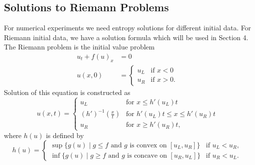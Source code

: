 \subsection{Solutions to Riemann Problems}
For numerical experiments we need entropy solutions for different initial data. For Riemann initial data, we have a solution formula which will be used in Section 4.
The Riemann problem is the initial value problem
\begin{equation}\label{eq: Riemann problem}
    \begin{split}
        u_{t} + f(u)_{x} & = 0 \\
        u(x,0)           & =
        \begin{cases}
            u_{L} & \text{if } x < 0  \\
            u_{R} & \text{if } x > 0.
        \end{cases}
    \end{split}
\end{equation}
Solution of this equation is constructed as
\begin{equation}\label{eq: Riemann solution}
    u(x,t)=
    \begin{cases}
        u_{L}                  & \text{for } x \leq h'(u_L)t               \\
        (h')^{-1}(\frac{x}{t}) & \text{for } h'(u_L)t \leq x \leq h'(u_R)t \\
        u_{R}                  & \text{for } x \geq h'(u_R)t,
    \end{cases}
\end{equation}
where $h(u)$ is defined by
\begin{equation}\label{eq:h}
    h(u) =
    \begin{cases}
        \sup\{ g(u) \mid g \leq f \text{ and } g \text{ is convex on } [u_L, u_R] \}  & \text{if } u_L < u_R, \\
        \inf\{ g(u) \mid g \geq f \text{ and } g \text{ is concave on } [u_R, u_L] \} & \text{if } u_R < u_L.
    \end{cases}
\end{equation}


